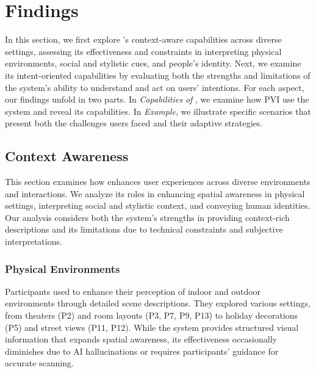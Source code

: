 \section{Findings}
\label{findings}

In this section, we first explore \sbma's context-aware capabilities across diverse settings, assessing its effectiveness and constraints in interpreting physical environments, social and stylistic cues, and people's identity. 
% 
Next, we examine its intent-oriented capabilities by evaluating both the strengths and limitations of the system's ability to understand and act on users' intentions. 
% 
For each aspect, our findings unfold in two parts. In \textit{Capabilities of \bma}, we examine how PVI use the system and reveal its capabilities. In \textit{Example}, we illustrate specific scenarios that present both the challenges users faced and their adaptive strategies. 



\subsection{Context Awareness}

This section examines how \bma{} enhances user experiences across diverse environments and interactions. We analyze its roles in enhancing spatial awareness in physical settings, interpreting social and stylistic context, and conveying human identities. 
% 
Our analysis considers both the system's strengths in providing context-rich descriptions and its limitations due to technical constraints and subjective interpretations. 





\subsubsection{Physical Environments}
\label{physical_environments}


Participants used \sbma{} to enhance their perception of indoor and outdoor environments through detailed scene descriptions. 
They explored various settings, from theaters (P2) and room layouts (P3, P7, P9, P13) to holiday decorations (P5) and street views (P11, P12). While the system provides structured visual information that expands spatial awareness, its effectiveness occasionally diminishes due to AI hallucinations or requires participants' guidance for accurate scanning. 




